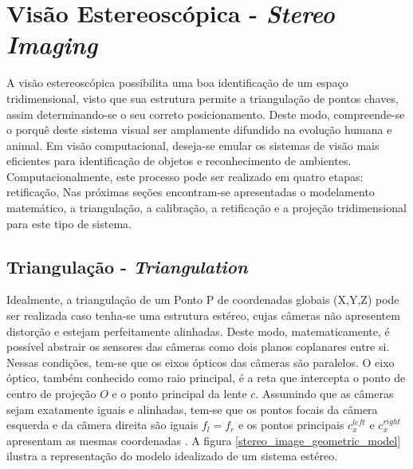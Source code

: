 \chapter{Visão Estereoscópica - \textit{Stereo Imaging}}
\label{Revisão Bibliográfica}


A visão estereoscópica possibilita uma boa identificação de um espaço tridimensional, visto que sua estrutura permite a triangulação de pontos chaves, assim determinando-se o seu correto posicionamento. Deste modo, compreende-se o porquê deste sistema visual ser amplamente difundido na evolução humana e animal. Em visão computacional, deseja-se emular os sistemas de visão mais eficientes para identificação de objetos e reconhecimento de ambientes. Computacionalmente, este processo pode ser realizado em quatro etapas: retificação,  Nas próximas seções encontram-se apresentadas o modelamento matemático, a triangulação, a calibração, a retificação e a projeção tridimensional para este tipo de sistema. 


\section{Triangulação - \textit{Triangulation}}

Idealmente, a triangulação de um Ponto P de coordenadas globais (X,Y,Z) pode ser realizada caso tenha-se uma estrutura estéreo, cujas câmeras não apresentem distorção e estejam perfeitamente alinhadas. Deste modo, matematicamente, é possível abstrair os sensores das câmeras como dois planos coplanares entre si. Nessas condições, tem-se que os eixos ópticos das câmeras são paralelos. O eixo óptico, também conhecido como raio principal, é a reta que intercepta o ponto de centro de projeção ${O}$ e o ponto principal da lente ${c}$. Assumindo que as câmeras sejam exatamente iguais e alinhadas, tem-se que os pontos focais da câmera esquerda e da câmera direita são iguais ${f_l = f_r}$ e os pontos principais ${c^{left}_x}$ e  ${c^{right}_x}$ apresentam as mesmas coordenadas \cite{Bradski2008}. A figura \ref{stereo_image_geometric_model} ilustra a representação do modelo idealizado de um sistema estéreo.


